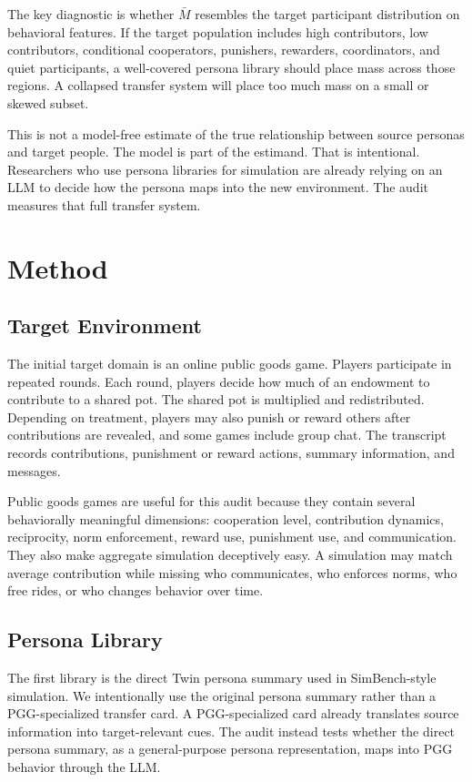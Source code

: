 \documentclass[11pt]{article}
\begin{document}
The key diagnostic is whether \(\bar{M}\) resembles the target participant distribution on behavioral features. If the target population includes high contributors, low contributors, conditional cooperators, punishers, rewarders, coordinators, and quiet participants, a well-covered persona library should place mass across those regions. A collapsed transfer system will place too much mass on a small or skewed subset.

This is not a model-free estimate of the true relationship between source personas and target people. The model is part of the estimand. That is intentional. Researchers who use persona libraries for simulation are already relying on an LLM to decide how the persona maps into the new environment. The audit measures that full transfer system.

\section{Method}

\subsection{Target Environment}

The initial target domain is an online public goods game. Players participate in repeated rounds. Each round, players decide how much of an endowment to contribute to a shared pot. The shared pot is multiplied and redistributed. Depending on treatment, players may also punish or reward others after contributions are revealed, and some games include group chat. The transcript records contributions, punishment or reward actions, summary information, and messages.

Public goods games are useful for this audit because they contain several behaviorally meaningful dimensions: cooperation level, contribution dynamics, reciprocity, norm enforcement, reward use, punishment use, and communication. They also make aggregate simulation deceptively easy. A simulation may match average contribution while missing who communicates, who enforces norms, who free rides, or who changes behavior over time.

\subsection{Persona Library}

The first library is the direct Twin persona summary used in SimBench-style simulation. We intentionally use the original persona summary rather than a PGG-specialized transfer card. A PGG-specialized card already translates source information into target-relevant cues. The audit instead tests whether the direct persona summary, as a general-purpose persona representation, maps into PGG behavior through the LLM.
\end{document}
